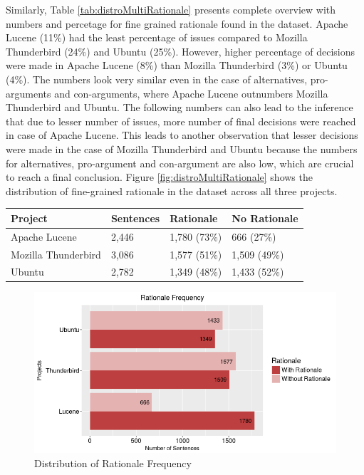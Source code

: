 \documentclass[a4paper,12pt,twoside]{report}
\begin{document}
Similarly, Table \ref{tab:distroMultiRationale} presents complete overview with numbers and percetage for fine grained rationale found in the dataset. Apache Lucene (11\%) had the least percentage of issues compared to Mozilla Thunderbird (24\%) and Ubuntu (25\%). However, higher percentage of decisions were made in Apache Lucene (8\%) than Mozilla Thunderbird (3\%) or Ubuntu (4\%). The numbers look very similar even in the case of alternatives, pro-arguments and con-arguments, where Apache Lucene outnumbers Mozilla Thunderbird and Ubuntu. 
\newline \newline
The following numbers can also lead to the inference that due to lesser number of issues, more number of final decisions were reached in case of Apache Lucene. This leads to another observation that lesser decisions were made in the case of Mozilla Thunderbird and Ubuntu because the numbers for alternatives, pro-argument and con-argument are also low, which are crucial to reach a final conclusion. Figure \ref{fig:distroMultiRationale} shows the distribution of fine-grained rationale in the dataset across all three projects. 

\begin{table} %
    \centering
    \begin{adjustbox}{max width=\columnwidth}
    \def\arraystretch{1} %
    \begin{tabular}{p{4cm} p{3cm} p{3cm} p{3cm}}
        \toprule
        \textbf{Project} & \textbf{Sentences} & \textbf{Rationale} & \textbf{No Rationale}\\
        \midrule
			Apache Lucene & 2,446 & 1,780 (73\%) & 666 (27\%)\\
			Mozilla Thunderbird & 3,086 & 1,577 (51\%) & 1,509 (49\%)\\ 
			Ubuntu & 2,782 & 1,349 (48\%) & 1,433 (52\%)\\
        \midrule
    \end{tabular}
    \end{adjustbox}
    \label{tab:distroBinaryRationale}
\end{table}

\begin{figure}[h] %
    \centering
    \includegraphics[width=14cm]{binary-distro-rationale}
    \caption{Distribution of Rationale Frequency}
    \label{fig:distroBinaryRationale}
\end{figure}
\end{document}
